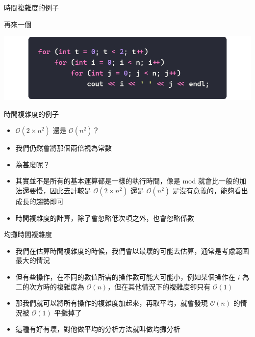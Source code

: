 \documentclass[aspectratio=169]{beamer}
\begin{document}
	\begin{frame}{時間複雜度的例子}
		\begin{center}
			再來一個
		\end{center}
		\begin{center}
			\includegraphics[height=0.4\textheight]{./src/O(n^2)_2.png}
		\end{center}
	\end{frame}

	\begin{frame}{時間複雜度的例子}
		\begin{itemize}
			\item<1-> $\mathcal{O}(2\times n^2)$ 還是 $\mathcal{O}(n^2)$？
			\item<2-> 我們仍然會將那個兩倍視為常數
			\item<3-> 為甚麼呢？
			\item<4-> 其實並不是所有的基本運算都是一樣的執行時間，像是 mod 就會比一般的加法還要慢，因此去計較是 $\mathcal{O}(2\times n^2)$ 還是 $\mathcal{O}(n^2)$ 是沒有意義的，能夠看出成長的趨勢即可
			\item<5-> 時間複雜度的計算，除了會忽略低次項之外，也會忽略係數
		\end{itemize}
	\end{frame}

	\begin{frame}{均攤時間複雜度}
		\begin{itemize}
			\item<1-> 我們在估算時間複雜度的時候，我們會以最壞的可能去估算，通常是考慮範圍最大的情況
			\item<2-> 但有些操作，在不同的數值所需的操作數可能大可能小，例如某個操作在 $i$ 為二的次方時的複雜度為 $\mathcal{O}(n)$，但在其他情況下的複雜度卻只有 $\mathcal{O}(1)$
			\item<3-> 那我們就可以將所有操作的複雜度加起來，再取平均，就會發現 $\mathcal{O}(n)$ 的情況被 $\mathcal{O}(1)$ 平攤掉了
			\item<4-> 這種有好有壞，對他做平均的分析方法就叫做均攤分析
		\end{itemize}
	\end{frame}
\end{document}
